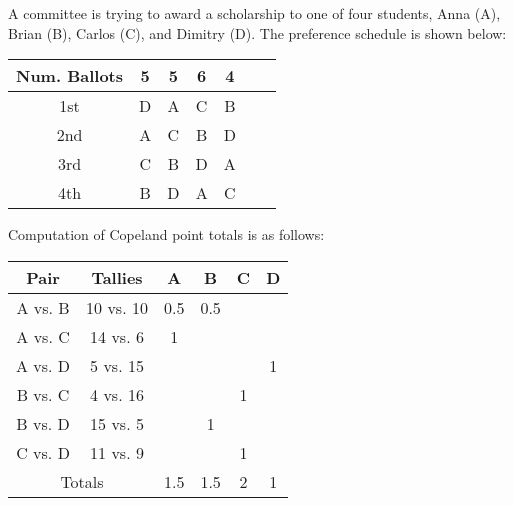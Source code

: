 \begin{example}
  A committee is trying to award a scholarship to one of four
  students, Anna (A), Brian (B), Carlos (C), and Dimitry (D). The
  preference schedule is shown below:
  \begin{center}
    \begin{tabular}[h]{ccccccc}
      \toprule
      Num. Ballots & 5 & 5 & 6 & 4 \\
      \midrule
      1st & D & A & C & B \\
      2nd & A & C & B & D \\
      3rd & C & B & D & A \\
      4th & B & D & A & C \\
      \bottomrule
    \end{tabular}
  \end{center}
  Computation of Copeland point totals is as follows:
  \begin{center}
    \begin{tabular}[h!]{cccccc}
      \toprule
      Pair & Tallies & A & B & C & D \\
      \toprule
      A vs. B & 10 vs. 10 & 0.5 & 0.5 & & \\
      A vs. C & 14 vs. 6  &   1 &     &   & \\
      A vs. D & 5 vs. 15  &     &     &   & 1 \\
      B vs. C & 4 vs. 16  &     &     & 1 & \\
      B vs. D & 15 vs. 5  &     &   1 &   & \\
      C vs. D & 11 vs. 9  &     &     & 1 & \\
      \midrule

      \multicolumn{2}{c}{Totals} & 1.5 & 1.5 & 2 & 1 \\
      \bottomrule
    \end{tabular}
  \end{center}


\end{example}
